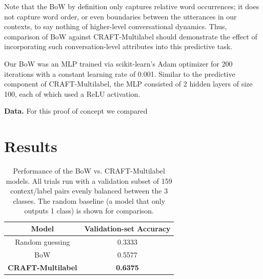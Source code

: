 \documentclass{article}
\begin{document}
Note that the BoW by definition only captures relative word occurrences; it does not capture word order, or even boundaries between the utterances in our contexts, to say nothing of higher-level conversational dynamics. Thus, comparison of BoW against CRAFT-Multilabel should demonstrate the effect of incorporating such conversation-level attributes into this predictive task.

Our BoW was an MLP trained via scikit-learn's Adam optimizer \cite{scikit-learn} for 200 iterations with a constant learning rate of 0.001. Similar to the predictive component of CRAFT-Multilabel, the MLP consisted of 2 hidden layers of size 100, each of which used a ReLU activation.

\textbf{Data.} For this proof of concept we compared 


\section{Results}
\label{sec:results}

\begin{table}[]
  \centering
  \begin{tabular}{@{}cc@{}}
  \toprule
  \textbf{Model}            & \textbf{Validation-set Accuracy} \\ \midrule
  Random guessing           & 0.3333                           \\
  BoW                       & 0.5577                           \\
  \textbf{CRAFT-Multilabel} & \textbf{0.6375}                  \\ \bottomrule
  \end{tabular}
  \caption{Performance of the BoW vs. CRAFT-Multilabel models. All trials run with a validation subset of 159 context/label pairs evenly balanced between the 3 classes. The random baseline (a model that only outputs 1 class) is shown for comparison.}
  \label{tab:results}
\end{table}
\end{document}
